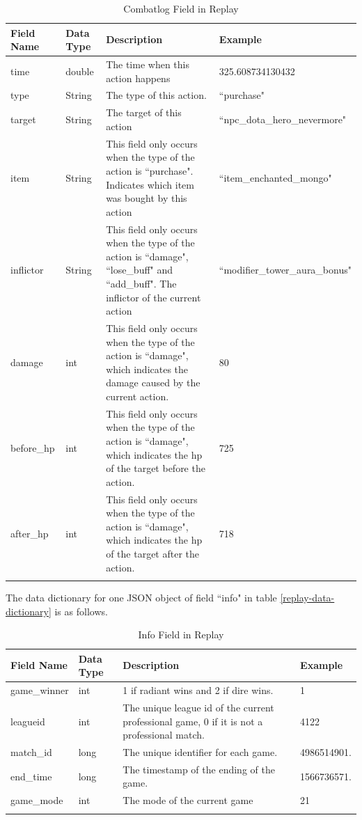 \documentclass{article}
\begin{document}
\begin{longtable}{|p{2.5cm}|p{2cm}|p{5.5cm}|p{3cm}|}

\hline
\textbf{Field Name} & \textbf{Data Type} & \textbf{Description}  & \textbf{Example} \\
\hline
\endhead

time & double & The time when this action happens & 325.608734130432 \\
\hline
type & String & The type of this action. & ``purchase" \\
\hline
target & String & The target of this action & ``npc\_dota\_hero\_nevermore" \\
\hline
item & String & This field only occurs when the type of the action is ``purchase". Indicates which item was bought by this action & ``item\_enchanted\_mongo" \\
\hline
inflictor & String & This field only occurs when the type of the action is ``damage", ``lose\_buff" and ``add\_buff". The inflictor of the current action & ``modifier\_tower\_aura\_bonus" \\
\hline
damage & int & This field only occurs when the type of the action is ``damage", which indicates the damage caused by the current action. & 80 \\
\hline
before\_hp & int &  This field only occurs when the type of the action is ``damage", which indicates the hp of the target before the action. & 725 \\
\hline
after\_hp & int &  This field only occurs when the type of the action is ``damage", which indicates the hp of the target after the action. & 718 \\
\hline
\caption{Combatlog Field in Replay}
\label{combat-field-in-replay}
\end{longtable}

The data dictionary for one JSON object of field ``info" in table \ref{replay-data-dictionary} is as follows.

\begin{longtable}{|p{2.5cm}|p{2cm}|p{5.5cm}|p{3cm}|}

\hline
\textbf{Field Name} & \textbf{Data Type} & \textbf{Description}  & \textbf{Example} \\
\hline
\endhead

game\_winner & int & 1 if radiant wins and 2 if dire wins. & 1 \\
\hline
leagueid & int & The unique league id of the current professional game, 0 if it is not a professional match. & 4122 \\
\hline
match\_id & long & The unique identifier for each game. & 4986514901. \\
\hline
end\_time & long & The timestamp of the ending of the game. & 1566736571. \\
\hline
game\_mode & int & The mode of the current game & 21 \\
\hline
\caption{Info Field in Replay}
\label{info-field-in-replay}
\end{longtable}
\end{document}
